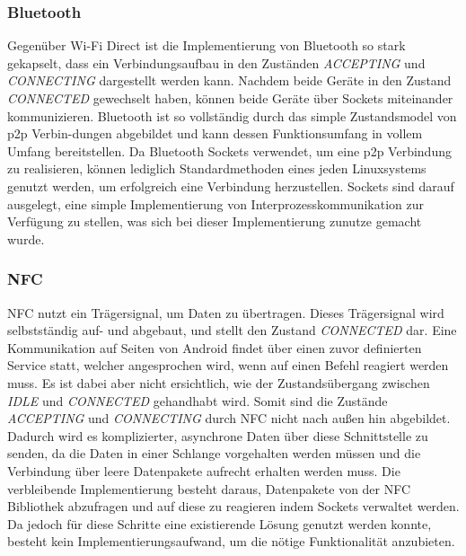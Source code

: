 		\subsubsection{Bluetooth} Gegenüber Wi-Fi Direct ist die Implementierung von Bluetooth so stark gekapselt, dass ein Verbindungsaufbau in den Zuständen {\it ACCEPTING} und {\it CONNECTING} dargestellt werden kann. Nachdem beide Geräte in den Zustand {\it CONNECTED} gewechselt haben, können beide Geräte über Sockets miteinander kommunizieren. Bluetooth ist so vollständig durch das simple Zustandsmodel von p2p Verbin-dungen abgebildet und kann dessen Funktionsumfang in vollem Umfang bereitstellen. Da Bluetooth Sockets verwendet, um eine p2p Verbindung zu realisieren, können lediglich Standardmethoden eines jeden Linuxsystems genutzt werden, um erfolgreich eine Verbindung herzustellen. Sockets sind darauf ausgelegt, eine simple Implementierung von Interprozesskommunikation zur Verfügung zu stellen, was sich bei dieser Implementierung zunutze gemacht wurde.
		
	  \subsubsection{NFC} NFC nutzt ein Trägersignal, um Daten zu übertragen. Dieses Trägersignal wird \linebreak selbstständig auf- und abgebaut, und stellt den Zustand {\it CONNECTED} dar. Eine Kommunikation auf Seiten von Android findet über einen zuvor definierten \linebreak Service statt, welcher angesprochen wird, wenn auf einen Befehl reagiert werden muss. Es ist dabei aber nicht ersichtlich, wie der Zustandsübergang zwischen {\it IDLE} und {\it CONNECTED} gehandhabt wird. Somit sind die Zustände {\it ACCEPTING} und {\it CONNECTING} durch NFC nicht nach außen hin abgebildet. Dadurch wird es komplizierter, asynchrone Daten über diese Schnittstelle zu senden, da die Daten in einer Schlange vorgehalten werden müssen und die Verbindung über leere Datenpakete aufrecht erhalten werden muss. Die verbleibende Implementierung besteht daraus, Datenpakete von der NFC Bibliothek abzufragen und auf diese zu reagieren indem Sockets verwaltet werden. Da jedoch für diese Schritte eine existierende Lösung genutzt werden konnte, besteht kein Implementierungsaufwand, um die nötige Funktionalität anzubieten.
	  
